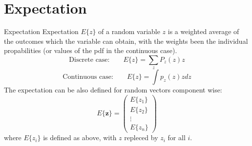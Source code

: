 \documentclass{beamer}
\begin{document}
%
%
%
%
%
%
%

\section{Expectation}

\begin{frame}{Expectation}
  Expectation $E\{z\}$ of a random variable $z$ is a weighted average of the
  outcomes which the variable can obtain, with the weights been the individual
  propabilities (or values of the pdf in the continuous case).
  \[
  \text{Discrete case:} \qquad
  E\{z\} = \sum_{z} P_{z}(z)z
  \]
  \[
  \text{Continuous case:} \qquad
  E\{z\} = \int p_{z}(z)zdz
  \]
  The expectation can be also defined for random vectors component wise:
  \[
  E\{\mathbf{z}\} =
  \begin{pmatrix} E\{z_1\} \\ E\{z_2\} \\ \vdots \\ E\{z_n\} \end{pmatrix}
  \]
  where $E\{z_i\}$ is defined as above, with $z$ repleced by $z_i$ for all $i$.
\end{frame}
\end{document}
